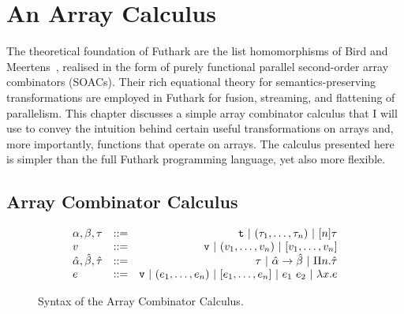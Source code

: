 \newcommand{\zip}{\mathrm{zip}}
\newcommand{\unzip}{\mathrm{unzip}}
\newcommand{\map}{\mathrm{map}}
\newcommand{\reduce}{\mathrm{reduce}}
\newcommand{\scan}{\mathrm{scan}}
\newcommand{\ascan}{\mathrm{ascan}}
\newcommand{\sscan}{\mathrm{sscan}}
\newcommand{\inj}{\mathrm{inj}}
\newcommand{\rep}{\mathrm{rep}}
\newcommand{\streamFold}{\mathrm{sFold}}
\newcommand{\fold}{\mathrm{fold}}
\newcommand{\seg}[1]{\mathbf{#1}}
\newcommand{\tto}{\,\Rightarrow\,}
\newcommand{\iso}{\,\Leftrightarrow\,}
\newcommand{\nat}{\mathbf{N}}
\newcommand{\concat}{\#}
\newcommand{\idd}{\mathrm{id}}
\newcommand{\Id}{\mathrm{id}}
\newcommand{\foldl}{\mathrm{foldl}}

\chapter{An Array Calculus}
\label{chap:calculus}

The theoretical foundation of Futhark are the list homomorphisms of
Bird and Meertens~\cite{Bird2}, realised in the form of purely
functional parallel second-order array combinators (SOACs). Their rich
equational theory for semantics-preserving transformations are
employed in Futhark for fusion, streaming, and flattening of
parallelism.  This chapter discusses a simple array combinator
calculus that I will use to convey the intuition behind certain useful
transformations on arrays and, more importantly, functions that
operate on arrays.  The calculus presented here is simpler than the
full Futhark programming language, yet also more flexible.

\section{Array Combinator Calculus}
\label{sec:arraycombinators}

\begin{figure}
  \centering
$$
\begin{array}{lrr}
  \alpha,\beta,\tau & ::= & \mbox{\texttt{t}}\ |\ (\tau_1, \ldots, \tau_n)\ |\ [n]\tau \\

  v & ::= & \mbox{\texttt{v}}\ |\ (v_{1}, \ldots, v_{n})\ |\ [v_{1}, \ldots, v_{n}] \\

  \hat{\alpha},\hat{\beta},\hat{\tau} &::=& \tau\ |\ \hat{\alpha}\rightarrow\hat{\beta}\ |\ \Pi n.\hat{\tau} \\

  e &::=& \mbox{\texttt{v}}\ |\ (e_{1}, \ldots, e_{n})\ |\ [e_{1}, \ldots, e_{n}]\ |\ e_1~e_2\ |\ \lambda x.e
\end{array}
$$
  \caption{Syntax of the Array Combinator Calculus.}
  \label{fig:arraycalculus_syntax}
\end{figure}

